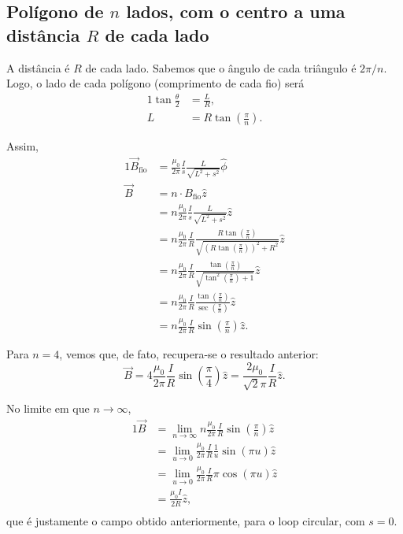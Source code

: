 \documentclass{article}
\begin{document}
\subsection{Polígono de $n$ lados, com o centro a uma distância $R$ de cada lado}
A distância é $R$ de cada lado. Sabemos que o ângulo de cada triângulo é $2\pi \slash n$. Logo, o lado de cada polígono (comprimento de cada fio) será
\begin{alignat}{1}
 \tan{\frac{\theta}{2}} &= \frac{L}{R},\\
 L &= R \tan{\left( \frac{\pi}{n} \right)}.
\end{alignat}

Assim,
\begin{alignat}{1}
 \vec{B}_{\mathrm{fio}} &= \frac{\mu_0}{2\pi} \frac{I}{s}\frac{L}{\sqrt{L^2 + s^2}} \hat{\phi}\\
 \vec{B} &= n \cdot B_{\mathrm{fio}} \hat{z}\\
 &= n \frac{\mu_0}{2\pi} \frac{I}{s}\frac{L}{\sqrt{L^2 + s^2}} \hat{z} \\
 &= n \frac{\mu_0}{2\pi} \frac{I}{R}\frac{R \tan{\left( \frac{\pi}{n} \right)}}{\sqrt{\left( R \tan{\left( \frac{\pi}{n} \right)} \right)^2 + R^2}} \hat{z} \\
 &= n \frac{\mu_0}{2\pi} \frac{I}{R}\frac{\tan{\left( \frac{\pi}{n} \right)}}{\sqrt{\tan^2{\left( \frac{\pi}{n} \right)} + 1}} \hat{z} \\
 &= n \frac{\mu_0}{2\pi} \frac{I}{R}\frac{\tan{\left( \frac{\pi}{n} \right)}}{\sec{\left( \frac{\pi}{n} \right)}} \hat{z} \\
 &= n \frac{\mu_0}{2\pi} \frac{I}{R} \sin{\left( \frac{\pi}{n} \right)} \hat{z}.
\end{alignat}

Para $n = 4$, vemos que, de fato, recupera-se o resultado anterior:
\begin{equation}
 \vec{B} = 4 \frac{\mu_0}{2\pi} \frac{I}{R} \sin{\left( \frac{\pi}{4} \right)} \hat{z} = \frac{2\mu_0}{\sqrt{2}\pi} \frac{I}{R} \hat{z}.
\end{equation}

No limite em que $n \to \infty$,
\begin{alignat}{1}
 \vec{B} &= \lim_{n \to \infty} n \frac{\mu_0}{2\pi} \frac{I}{R} \sin{\left( \frac{\pi}{n} \right)} \hat{z}\\
 &= \lim_{u \to 0} \frac{\mu_0}{2\pi} \frac{I}{R} \frac{1}{u}\sin{\left( \pi u \right)} \hat{z}\\
 &= \lim_{u \to 0} \frac{\mu_0}{2\pi} \frac{I}{R} \pi \cos{\left( \pi u \right)} \hat{z}\\
 &= \frac{\mu_0 I}{2R} \hat{z},\\
\end{alignat}
que é justamente o campo obtido anteriormente, para o loop circular, com $s=0$.
\end{document}
